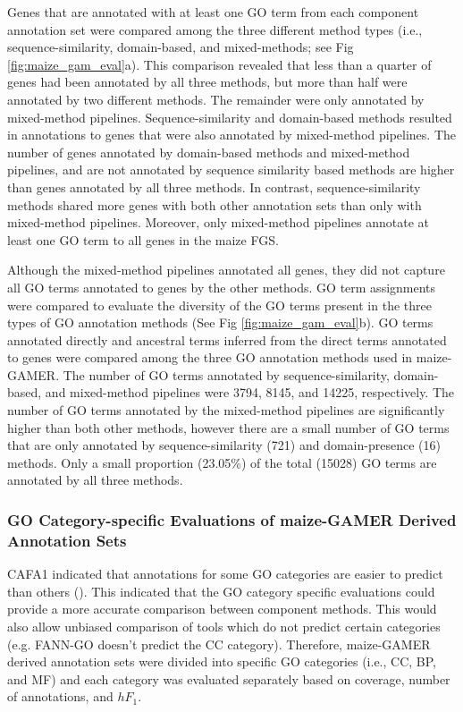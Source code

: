 Genes that are annotated with at least one GO term from each component annotation set were compared among the three different method types (i.e., sequence-similarity, domain-based, and mixed-methods; see Fig \ref{fig:maize_gam_eval}a). This comparison revealed that less than a quarter of genes had been annotated by all three methods, but more than half were annotated by two different methods. The remainder were only annotated by mixed-method pipelines. Sequence-similarity and domain-based methods resulted in annotations to genes that were also annotated by mixed-method pipelines. The number of genes annotated by domain-based methods and mixed-method pipelines, and are not annotated by sequence similarity based methods are higher than genes annotated by all three methods. In contrast, sequence-similarity methods shared more genes with both other annotation sets than only with mixed-method pipelines. Moreover, only mixed-method pipelines annotate at least one GO term to all genes in the maize FGS.

Although the mixed-method pipelines annotated all genes, they did not capture all GO terms annotated to genes by the other methods. GO term assignments were compared to evaluate the diversity of the GO terms present in the three types of GO annotation methods (See Fig \ref{fig:maize_gam_eval}b). GO terms annotated directly and ancestral terms inferred from the direct terms annotated to genes were compared among the three GO annotation methods used in maize-GAMER. The number of GO terms annotated by sequence-similarity, domain-based, and mixed-method pipelines were \num{3794}, \num{8145}, and \num{14225}, respectively. The number of GO terms annotated by the mixed-method pipelines are significantly higher than both other methods, however there are a small number of GO terms that are only annotated by sequence-similarity (721) and domain-presence (16) methods. Only a small proportion (23.05\%) of the total (\num{15028}) GO terms are annotated by all three methods.

\subsubsection{GO Category-specific Evaluations of maize-GAMER Derived Annotation Sets}
CAFA1 indicated that annotations for some GO categories are easier to predict than others (\cite{radivojac_2013-YN}). This indicated that the GO category specific evaluations could provide a more accurate comparison between component methods. This would also allow unbiased comparison of tools which do not predict certain categories (e.g. FANN-GO doesn't predict the CC category). Therefore, maize-GAMER derived annotation sets were divided into specific GO categories (i.e., CC, BP, and MF) and each category was evaluated separately based on coverage, number of annotations, and $hF_1$. 

